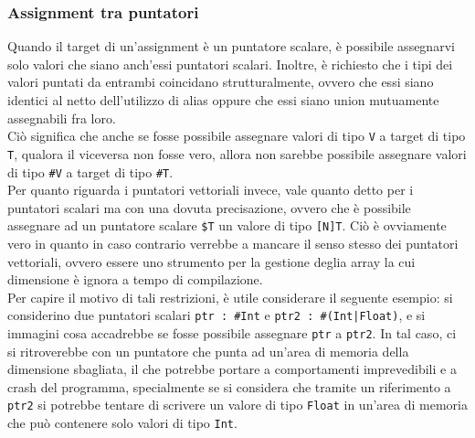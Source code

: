 \subsubsection{Assignment tra puntatori}
Quando il target di un'assignment è un puntatore scalare, è possibile assegnarvi solo 
valori che siano anch'essi puntatori scalari. Inoltre, è richiesto che i tipi dei valori puntati
da entrambi coincidano strutturalmente, ovvero che essi siano identici al netto dell'utilizzo di alias 
oppure che essi siano union mutuamente assegnabili fra loro. \\  

Ciò significa che anche se fosse possibile assegnare
valori di tipo \texttt{V} a target di tipo \texttt{T}, qualora il viceversa non fosse vero, 
allora non sarebbe possibile assegnare valori di tipo \texttt{\#V} a target di tipo \texttt{\#T}. \\

Per quanto riguarda i puntatori vettoriali invece, vale quanto detto per i puntatori scalari 
ma con una dovuta precisazione, ovvero che è possibile assegnare ad un puntatore scalare 
\texttt{\$T} un valore di tipo \texttt{[N]T}. Ciò è ovviamente vero in quanto in caso contrario 
verrebbe a mancare il senso stesso dei puntatori vettoriali, ovvero essere uno strumento per la 
gestione deglia array la cui dimensione è ignora a tempo di compilazione. \\

Per capire il motivo di tali restrizioni, è utile considerare il seguente esempio: si considerino
due puntatori scalari \texttt{ptr : \#Int} e \texttt{ptr2 : \#(Int|Float)}, e si immagini cosa 
accadrebbe se fosse possibile assegnare \texttt{ptr} a \texttt{ptr2}. In tal caso, ci si ritroverebbe
con un puntatore che punta ad un'area di memoria della dimensione sbagliata, il che potrebbe portare
a comportamenti imprevedibili e a crash del programma, specialmente se si considera che tramite  un 
riferimento a \texttt{ptr2} si potrebbe tentare di scrivere un valore di tipo \texttt{Float} in un'area
di memoria che può contenere solo valori di tipo \texttt{Int}. \\